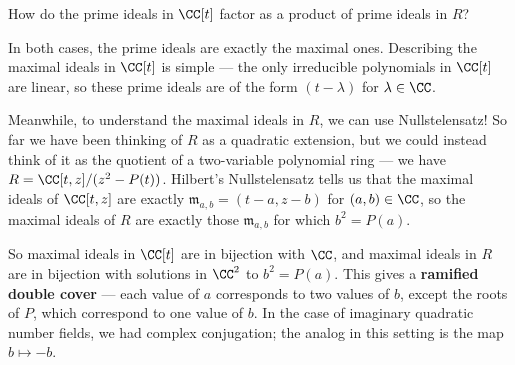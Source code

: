 \begin{qq}
How do the prime ideals in $\CC[t]$ factor as a product of prime ideals in $R$?
\end{qq}

In both cases, the prime ideals are exactly the maximal ones. Describing the maximal ideals in $\CC[t]$ is simple --- the only irreducible polynomials in $\CC[t]$ are linear, so these prime ideals are of the form $(t - \lambda)$ for $\lambda \in \CC$. 

Meanwhile, to understand the maximal ideals in $R$, we can use Nullstelensatz! So far we have been thinking of $R$ as a quadratic extension, but we could instead think of it as the quotient of a two-variable polynomial ring --- we have $R = \CC[t, z]/(z^2 - P(t))$. Hilbert's Nullstelensatz tells us that the maximal ideals of $\CC[t, z]$ are exactly $\mathfrak{m}_{a, b} = (t - a, z - b)$ for $(a, b) \in \CC$, so the maximal ideals of $R$ are exactly those $\mathfrak{m}_{a, b}$ for which $b^2 = P(a)$. 

So maximal ideals in $\CC[t]$ are in bijection with $\CC$, and maximal ideals in $R$ are in bijection with solutions in $\CC^2$ to $b^2 = P(a)$. This gives a \textbf{ramified double cover} --- each value of $a$ corresponds to two values of $b$, except the roots of $P$, which correspond to one value of $b$. In the case of imaginary quadratic number fields, we had complex conjugation; the analog in this setting is the map $b \mapsto -b$. 










